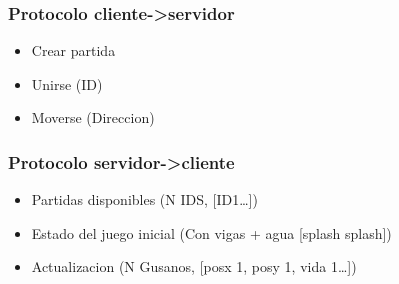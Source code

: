 \documentclass[11pt]{article}
\begin{document}
\subsubsection{Protocolo cliente->servidor}
\label{sec:org2ad4ea3}
\begin{itemize}
\item Crear partida
\item Unirse (ID)
\item Moverse (Direccion)
\end{itemize}

\subsubsection{Protocolo servidor->cliente}
\label{sec:orga0d5140}
\begin{itemize}
\item Partidas disponibles (N IDS, [ID1\ldots{}])
\item Estado del juego inicial (Con vigas + agua [splash splash])
\item Actualizacion (N Gusanos, [posx 1, posy 1, vida 1\ldots{}])
\end{itemize}
\end{document}
